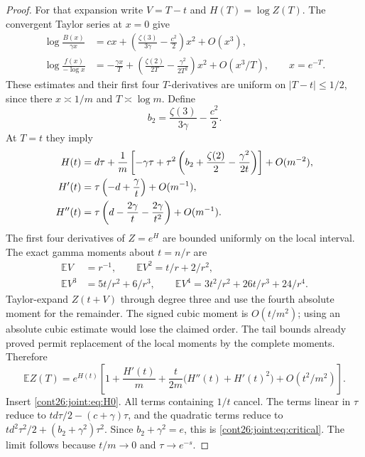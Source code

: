 \documentclass[11pt,letterpaper]{article}
\numberwithin{equation}{section}
\theoremstyle{plain}
\theoremstyle{definition}
\theoremstyle{remark}
\begin{document}
\begin{proof}
For that expansion write $V=T-t$ and $H(T)=\log Z(T)$.
The convergent Taylor series at $x=0$ give
\begin{align*}
 \log\frac{B(x)}{\gamma x}
 &=cx+\left(\frac{\zeta(3)}{3\gamma}-\frac{c^2}{2}\right)x^2
   +O(x^3),\\
 \log\frac{f(x)}{-\log x}
 &=-\frac{\gamma x}{T}
 +\left(\frac{\zeta(2)}{2T}-\frac{\gamma^2}{2T^2}\right)x^2
 +O(x^3/T),\qquad x=e^{-T}.
\end{align*}
These estimates and their first four $T$-derivatives are uniform
on $|T-t|\le1/2$, since there $x\asymp1/m$ and $T\asymp\log m$.
Define
\[
 b_2=\frac{\zeta(3)}{3\gamma}-\frac{c^2}{2}.
\]
At $T=t$ they imply
\begin{align}
 H(t)&=d\tau+\frac1m\left[
 -\gamma\tau+\tau^2\left(b_2+\frac{\zeta(2)}2
                         -\frac{\gamma^2}{2t}\right)\right]
 +O(m^{-2}),\label{cont26:joint:eq:H0}\\
 H'(t)&=\tau\left(-d+\frac\gamma t\right)+O(m^{-1}),\notag\\
 H''(t)&=\tau\left(d-\frac{2\gamma}t-
                           \frac{2\gamma}{t^2}\right)+O(m^{-1}).\notag
\end{align}
The first four derivatives of $Z=e^H$ are bounded uniformly on the
local interval.  The exact gamma moments about $t=n/r$ are
\begin{align*}
 \mathbb EV&=r^{-1},\qquad
 \mathbb EV^2=t/r+2/r^2,\\
 \mathbb EV^3&=5t/r^2+6/r^3,\qquad
 \mathbb EV^4=3t^2/r^2+26t/r^3+24/r^4.
\end{align*}
Taylor-expand $Z(t+V)$ through degree three and use the fourth
absolute moment for the remainder.  The signed cubic moment is
$O(t/m^2)$; using an absolute cubic estimate would lose the claimed
order.  The tail bounds already proved permit replacement of
the local moments by the complete moments.  Therefore
\begin{equation}\label{cont26:joint:eq:expect-expansion}
 \mathbb E Z(T)=e^{H(t)}
 \left[1+\frac{H'(t)}m+
 \frac{t}{2m}\bigl(H''(t)+H'(t)^2\bigr)
 +O(t^2/m^2)\right].
\end{equation}
Insert \eqref{cont26:joint:eq:H0}.  All terms containing $1/t$ cancel.
The terms linear in $\tau$ reduce to
$td\tau/2-(c+\gamma)\tau$, and the quadratic terms reduce to
$td^2\tau^2/2+(b_2+\gamma^2)\tau^2$.
Since $b_2+\gamma^2=e$, this is \eqref{cont26:joint:eq:critical}.
The limit follows because $t/m\to0$ and $\tau\to e^{-s}$.
\end{proof}
\end{document}
